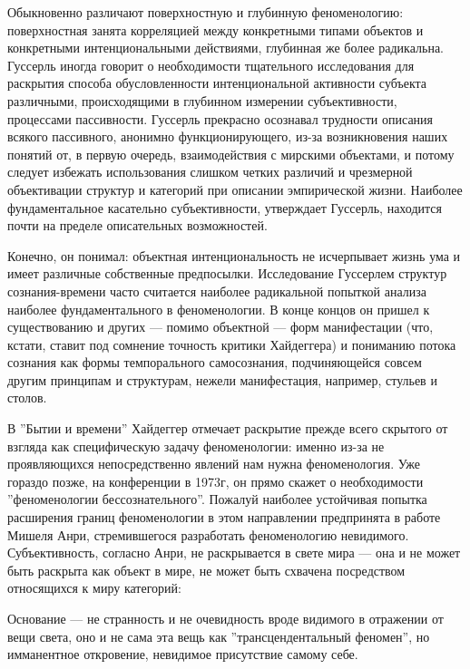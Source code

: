 \documentclass[11pt]{book}
\begin{document}
Обыкновенно различают поверхностную и глубинную феноменологию: поверхностная занята корреляцией между конкретными типами объектов и конкретными интенциональными действиями, глубинная же более радикальна. Гуссерль иногда говорит о необходимости тщательного исследования для раскрытия способа обусловленности интенциональной активности субъекта различными, происходящими в глубинном измерении субъективности, процессами пассивности. Гуссерль прекрасно осознавал трудности описания всякого пассивного, анонимно функционирующего, из-за возникновения наших понятий от, в первую очередь, взаимодействия с мирскими объектами, и потому следует избежать использования слишком четких различий и чрезмерной объективации структур и категорий при описании эмпирической жизни. Наиболее фундаментальное касательно субъективности, утверждает Гуссерль, находится почти на пределе описательных возможностей.

Конечно, он понимал: объектная интенциональность не исчерпывает жизнь ума и имеет различные собственные предпосылки. Исследование Гуссерлем структур сознания-времени часто считается наиболее радикальной попыткой анализа наиболее фундаментального в феноменологии. В конце концов он пришел к существованию и других --- помимо объектной --- форм манифестации (что, кстати, ставит под сомнение точность критики Хайдеггера) и пониманию потока сознания как формы темпорального самосознания, подчиняющейся совсем другим принципам и структурам, нежели манифестация, например, стульев и столов.

В ''Бытии и времени'' Хайдеггер отмечает раскрытие прежде всего скрытого от взгляда как специфическую задачу феноменологии: именно из-за не проявляющихся непосредственно явлений нам нужна феноменология. Уже гораздо позже, на конференции в 1973г, он прямо скажет о необходимости ''феноменологии бессознательного''. Пожалуй наиболее устойчивая попытка расширения границ феноменологии в этом направлении предпринята в работе Мишеля Анри, стремившегося разработать феноменологию невидимого. Субъективность, согласно Анри, не раскрывается в свете мира --- она и не может быть раскрыта как объект в мире, не может быть схвачена посредством относящихся к миру категорий:

\smallskip
{}\relax
{}\relax

Основание --- не странность и не очевидность вроде видимого в отражении от вещи света, оно и не сама эта вещь как ''трансцендентальный феномен'', но имманентное откровение, невидимое присутствие самому себе.
\end{document}
